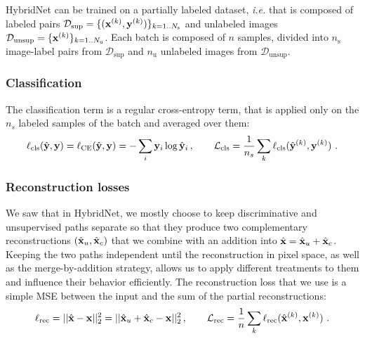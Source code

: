 HybridNet can be trained on a partially labeled dataset, \textit{i.e.} that is composed of labeled pairs $\mathcal D_\mathrm{sup} = \{(\mathbf{x}^{(k)}, \mathbf{y}^{(k)})\}_{k=1..N_\mathrm{s}}$ and unlabeled images $\mathcal D_\mathrm{unsup} = \{\mathbf{x}^{(k)}\}_{k=1..N_\mathrm{u}}$.
Each batch is composed of $n$ samples, divided into $n_\mathrm{s}$ image-label pairs from $\mathcal D_\mathrm{sup}$ and $n_\mathrm{u}$ unlabeled images from $\mathcal D_\mathrm{unsup}$.

\subsubsection{Classification}

The classification term is a regular cross-entropy term, that is applied only on the $n_s$ labeled samples of the batch and averaged over them:
\begin{equation}
	\ell_\mathrm{cls}(\hat{\mathbf{y}}, \mathbf{y}) = \ell_\mathrm{CE}(\hat{\mathbf{y}}, \mathbf{y}) = -\sum_i \mathbf{y}_i \log \hat{\mathbf{y}}_i \, , \qquad \mathcal L_\mathrm{cls}=\frac{1}{n_s} \sum_k \ell_\mathrm{cls}(\hat{\mathbf{y}}^{(k)}, \mathbf{y}^{(k)}) \ .
\end{equation}

\subsubsection{Reconstruction losses}

We saw that in HybridNet, we mostly choose to keep discriminative and unsupervised paths separate so that they produce two complementary reconstructions $(\hat{\mathbf{x}}_u, \hat{\mathbf{x}}_c)$ that we combine with an addition into $\hat{\mathbf{x}} = \hat{\mathbf{x}}_u + \hat{\mathbf{x}}_c$. Keeping the two paths independent until the reconstruction in pixel space, as well as the merge-by-addition strategy, allows us to apply different treatments to them and influence their behavior efficiently. The reconstruction loss that we use is a simple \ac{MSE} between the input and the sum of the partial reconstructions:
\begin{equation}
	\ell_\mathrm{rec} = ||\hat{\mathbf{x}} - \mathbf{x}||_2^2 = ||\hat{\mathbf{x}}_u + \hat{\mathbf{x}}_c - \mathbf{x}||_2^2\,, \qquad \mathcal L_\mathrm{rec}=\frac{1}{n} \sum_k \ell_\mathrm{rec}(\hat{\mathbf{x}}^{(k)}, \mathbf{x}^{(k)}) \ .
\end{equation}

